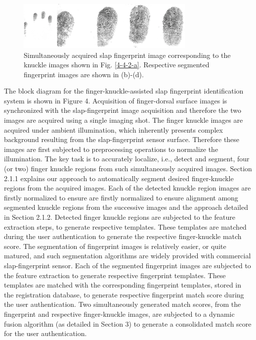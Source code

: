 \begin{figure}[!ht]
    \centering
    \includegraphics[width=3.4in]{Figures/4-4-2-fingerprint.png}
    \caption{Simultaneously acquired slap fingerprint image corresponding to the knuckle images shown in Fig. \ref{4-4-2-a}. Respective segmented fingerprint images are shown in (b)-(d).}
    \label{capture-finerprint}
\end{figure}

The block diagram for the finger-knuckle-assisted slap fingerprint identification system is shown in Figure 4. Acquisition of finger-dorsal surface images is synchronized with the slap-fingerprint image acquisition and therefore the two images are acquired using a single imaging shot. The finger knuckle images are acquired under ambient illumination, which inherently presents complex background resulting from the slap-fingerprint sensor surface. Therefore these images are first subjected to preprocessing operations to normalize the illumination. The key task is to accurately localize, i.e., detect and segment, four (or two) finger knuckle regions from such simultaneously acquired images. Section 2.1.1 explains our approach to automatically segment desired finger-knuckle regions from the acquired images. Each   of   the   detected   knuckle   region   images  are  firstly normalized to ensure are  firstly normalized to ensure alignment among segmented knuckle regions from the successive images and the approach detailed in Section 2.1.2. Detected finger knuckle regions are subjected to the feature extraction steps, to generate respective templates. These templates are matched during the user authentication to generate the respective finger-knuckle match score. The segmentation of fingerprint images is relatively easier, or quite matured, and such segmentation algorithms are widely provided with commercial slap-fingerprint sensor. Each of the segmented fingerprint images are subjected to the feature extraction to generate respective fingerprint templates. These templates are matched with the corresponding fingerprint templates, stored in the registration database, to generate respective fingerprint match score during the user authentication. Two simultaneously generated match scores, from the fingerprint and respective finger-knuckle images, are subjected to a dynamic fusion algorithm (as detailed in Section 3) to generate a consolidated match score for the user authentication.   

